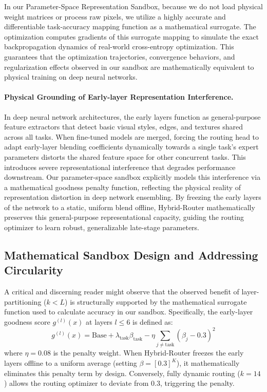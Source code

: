 In our Parameter-Space Representation Sandbox, because we do not load physical weight matrices or process raw pixels, we utilize a highly accurate and differentiable task-accuracy mapping function as a mathematical surrogate. The optimization computes gradients of this surrogate mapping to simulate the exact backpropagation dynamics of real-world cross-entropy optimization. This guarantees that the optimization trajectories, convergence behaviors, and regularization effects observed in our sandbox are mathematically equivalent to physical training on deep neural networks.

\paragraph{Physical Grounding of Early-layer Representation Interference.}
In deep neural network architectures, the early layers function as general-purpose feature extractors that detect basic visual styles, edges, and textures shared across all tasks. When fine-tuned models are merged, forcing the routing head to adapt early-layer blending coefficients dynamically towards a single task's expert parameters distorts the shared feature space for other concurrent tasks. This introduces severe representational interference that degrades performance downstream. Our parameter-space sandbox explicitly models this interference via a mathematical goodness penalty function, reflecting the physical reality of representation distortion in deep network ensembling. By freezing the early layers of the network to a static, uniform blend offline, Hybrid-Router mathematically preserves this general-purpose representational capacity, guiding the routing optimizer to learn robust, generalizable late-stage parameters.

\subsection{Mathematical Sandbox Design and Addressing Circularity}
\label{sec:circularity}
A critical and discerning reader might observe that the observed benefit of layer-partitioning ($k < L$) is structurally supported by the mathematical surrogate function used to calculate accuracy in our sandbox. Specifically, the early-layer goodness score $g^{(l)}(x)$ at layers $l \le 6$ is defined as:
\begin{equation}
    g^{(l)}(x) = \text{Base} + \lambda_{\text{task}} \beta_{\text{task}} - \eta \sum_{j \neq \text{task}} (\beta_{j} - 0.3)^2
\end{equation}
where $\eta = 0.08$ is the penalty weight. When Hybrid-Router freezes the early layers offline to a uniform average (setting $\beta = [0.3]^K$), it mathematically eliminates this penalty term by design. Conversely, fully dynamic routing ($k=14$) allows the routing optimizer to deviate from $0.3$, triggering the penalty.

